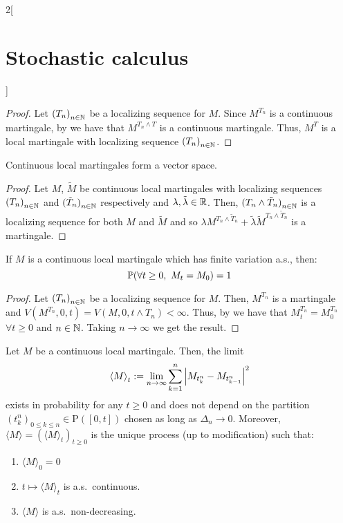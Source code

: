 \documentclass[../../../main_math.tex]{subfiles}
\begin{document}
\begin{multicols}{2}[\section{Stochastic calculus}]
\begin{theorem}
  \end{theorem}
  \begin{proof}
    Let ${(T_n)}_{n\in\mathbb{N}}$ be a localizing sequence for $M$. Since $M^{T_n}$ is a continuous martingale, by  we have that $M^{T_n\wedge T}$ is a continuous martingale. Thus, $M^T$ is a local martingale with localizing sequence ${(T_n)}_{n\in\mathbb{N}}$.
  \end{proof}
  \begin{proposition}
    Continuous local martingales form a vector space.
  \end{proposition}
  \begin{proof}
    Let $M$, $\tilde{M}$ be continuous local martingales with localizing sequences ${(T_n)}_{n\in\mathbb{N}}$ and ${(\tilde{T}_n)}_{n\in\mathbb{N}}$ respectively and $\lambda,\tilde{\lambda}\in\mathbb{R}$. Then, ${(T_n\wedge \tilde{T}_n)}_{n\in\mathbb{N}}$ is a localizing sequence for both $M$ and $\tilde{M}$ and so $\lambda M^{T_n\wedge \tilde{T}_n}+\tilde{\lambda}\tilde{M}^{T_n\wedge \tilde{T}_n}$ is a martingale.
  \end{proof}
  \begin{proposition}
    If $M$ is a continuous local martingale which has finite variation a.s., then:
    $$
      \Prob(\forall t\geq 0,\ M_t=M_0)=1
    $$
  \end{proposition}
  \begin{proof}
    Let ${(T_n)}_{n\in\mathbb{N}}$ be a localizing sequence for $M$. Then, $M^{T_n}$ is a martingale and $V(M^{T_n},0,t)=V(M,0,t\wedge T_n)<\infty$. Thus, by  we have that $M^{T_n}_t=M^{T_n}_0$ $\forall t\geq 0$ and $n\in\mathbb{N}$. Taking $n\to\infty$ we get the result.
  \end{proof}
  \begin{proposition}
    Let $M$ be a continuous local martingale. Then, the limit
    $$
      {\langle M\rangle}_t:=\lim_{n\to\infty}\sum_{k=1}^{n}\abs{M_{t_k^n}-M_{t_{k-1}^n}}^2
    $$
    exists in probability for any $t\geq 0$ and does not depend on the partition ${(t_k^n)}_{0\leq k\leq n}\in \mathrm{P}([0,t])$ chosen as long as $\Delta_n\to 0$. Moreover, $\langle M\rangle=({\langle M\rangle}_t)_{t\geq 0}$ is the unique process (up to modification) such that:
    \begin{enumerate}
      \item ${\langle M\rangle}_0=0$
      \item $t\mapsto {\langle M\rangle}_t$ is a.s.\ continuous.
      \item $\langle M\rangle$ is a.s.\ non-decreasing.

\end{enumerate}
\end{proposition}
\end{multicols}
\end{document}
